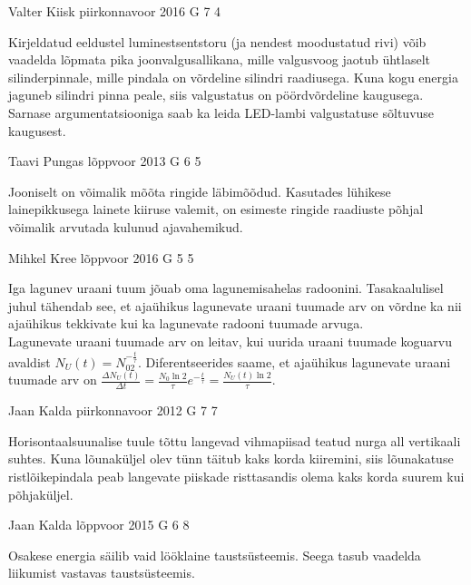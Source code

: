 \documentclass[11pt, twoside]{article}
\begin{document}
{%
{Valter Kiisk} %
{piirkonnavoor} %
{2016} %
{G 7} %
{4} %
{

\ifHint
Kirjeldatud eeldustel luminestsentstoru (ja nendest moodustatud rivi) võib vaadelda lõpmata pika joonvalgusallikana, mille valgusvoog jaotub ühtlaselt silinderpinnale, mille pindala on võrdeline silindri raadiusega. Kuna kogu energia jaguneb silindri pinna peale, siis valgustatus on pöördvõrdeline kaugusega. Sarnase argumentatsiooniga saab ka leida LED-lambi valgustatuse sõltuvuse kaugusest.
\fi
}

{Taavi Pungas} %
{lõppvoor} %
{2013} %
{G 6} %
{5} %
{

\ifHint
Jooniselt on võimalik mõõta ringide läbimõõdud. Kasutades lühikese lainepikkusega lainete kiiruse valemit, on esimeste ringide raadiuste põhjal võimalik arvutada kulunud ajavahemikud.
\fi
}

{Mihkel Kree} %
{lõppvoor} %
{2016} %
{G 5} %
{5} %
{

\ifHint
Iga lagunev uraani tuum jõuab oma lagunemisahelas radoonini. Tasakaalulisel juhul tähendab see, et ajaühikus lagunevate uraani tuumade arv on võrdne ka nii ajaühikus tekkivate kui ka lagunevate radooni tuumade arvuga.\\
Lagunevate uraani tuumade arv on leitav, kui uurida uraani tuumade koguarvu avaldist $N_U(t) = N_02^{-\frac{t}{\tau}}$. Diferentseerides saame, et ajaühikus lagunevate uraani tuumade arv on $\frac{\Delta N_U(t)}{\Delta t} = \frac{N_0\ln 2}{\tau}e^{-\frac{t}{\tau}} = \frac{N_U(t)\ln 2}{\tau}$. 
\fi
}

{Jaan Kalda} %
{piirkonnavoor} %
{2012} %
{G 7} %
{7} %
{

\ifHint
Horisontaalsuunalise tuule tõttu langevad vihmapiisad teatud nurga all vertikaali suhtes. Kuna lõunaküljel olev tünn täitub kaks korda kiiremini, siis lõunakatuse ristlõikepindala peab langevate piiskade risttasandis olema kaks korda suurem kui põhjaküljel.
\fi
}

{Jaan Kalda} %
{lõppvoor} %
{2015} %
{G 6} %
{8} %
{

\ifHint
Osakese energia säilib vaid lööklaine taustsüsteemis. Seega tasub vaadelda liikumist vastavas taustsüsteemis.
\fi
}

}
\end{document}
